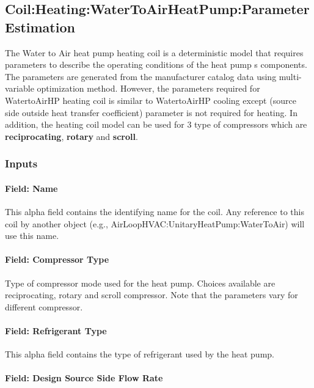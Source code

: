 \subsection{Coil:Heating:WaterToAirHeatPump:ParameterEstimation}\label{coilheatingwatertoairheatpumpparameterestimation}

The Water to Air heat pump heating coil is a deterministic model that requires parameters to describe the operating conditions of the heat pump s components. The parameters are generated from the manufacturer catalog data using multi-variable optimization method. However, the parameters required for WatertoAirHP heating coil is similar to WatertoAirHP cooling except (source side outside heat transfer coefficient) parameter is not required for heating. In addition, the heating coil model can be used for 3 type of compressors which are \textbf{reciprocating}, \textbf{rotary} and \textbf{scroll}.

\subsubsection{Inputs}\label{inputs-32}

\paragraph{Field: Name}\label{field-name-31}

This alpha field contains the identifying name for the coil. Any reference to this coil by another object (e.g., AirLoopHVAC:UnitaryHeatPump:WaterToAir) will use this name.

\paragraph{Field: Compressor Type}\label{field-compressor-type-1}

Type of compressor mode used for the heat pump. Choices available are reciprocating, rotary and scroll compressor. Note that the parameters vary for different compressor.

\paragraph{Field: Refrigerant Type}\label{field-refrigerant-type-1}

This alpha field contains the type of refrigerant used by the heat pump.

\paragraph{Field: Design Source Side Flow Rate}\label{field-design-source-side-flow-rate-1}

